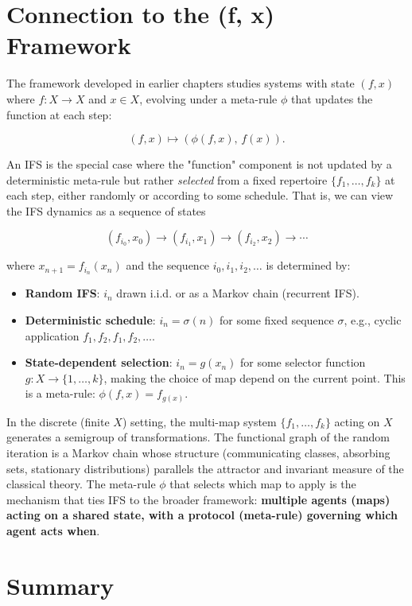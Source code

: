 \section{Connection to the (f, x) Framework}

The framework developed in earlier chapters studies systems with state $(f, x)$ where $f : X \to X$ and $x \in X$, evolving under a meta-rule $\phi$ that updates the function at each step:

\[(f, x) \mapsto (\phi(f, x), \, f(x)).\]

An IFS is the special case where the "function" component is not updated by a deterministic meta-rule but rather \textit{selected} from a fixed repertoire $\{ f_1, \ldots, f_k\} $ at each step, either randomly or according to some schedule. That is, we can view the IFS dynamics as a sequence of states

\[(f_{i_0}, x_0) \to (f_{i_1}, x_1) \to (f_{i_2}, x_2) \to \cdots\]

where $x_{n+1} = f_{i_n}(x_n)$ and the sequence $i_0, i_1, i_2, \ldots$ is determined by:

\begin{itemize}
\item \textbf{Random IFS}: $i_n$ drawn i.i.d. or as a Markov chain (recurrent IFS).
\item \textbf{Deterministic schedule}: $i_n = \sigma(n)$ for some fixed sequence $\sigma$, e.g., cyclic application $f_1, f_2, f_1, f_2, \ldots$.
\item \textbf{State-dependent selection}: $i_n = g(x_n)$ for some selector function $g : X \to \{ 1, \ldots, k\} $, making the choice of map depend on the current point. This is a meta-rule: $\phi(f, x) = f_{g(x)}$.
\end{itemize}

In the discrete (finite $X$) setting, the multi-map system $\{ f_1, \ldots, f_k\} $ acting on $X$ generates a semigroup of transformations. The functional graph of the random iteration is a Markov chain whose structure (communicating classes, absorbing sets, stationary distributions) parallels the attractor and invariant measure of the classical theory. The meta-rule $\phi$ that selects which map to apply is the mechanism that ties IFS to the broader framework: \textbf{multiple agents (maps) acting on a shared state, with a protocol (meta-rule) governing which agent acts when}.

\section{Summary}

